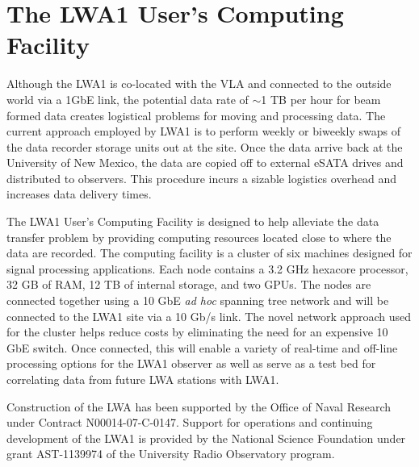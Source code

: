 \documentclass[11pt,twoside]{article}
\begin{document}
\section{\label{P42_sec:LUCF}The LWA1 User's Computing Facility}
Although the LWA1 is co-located with the VLA and connected to the outside world via a 1GbE link, the potential data rate of $\sim$1 TB per hour for beam formed data creates logistical problems for moving and processing data.  The current approach employed by LWA1 is to perform weekly or biweekly swaps of the data recorder storage units out at the site.  Once the data arrive back at the University of New Mexico, the data are copied off to external eSATA drives and distributed to observers.  This procedure incurs a sizable logistics overhead and increases data delivery times.

The LWA1 User's Computing Facility is designed to help alleviate the data transfer problem by providing computing resources located close to where the data are recorded.  The computing facility is a cluster of  six machines designed for signal processing applications.  Each node contains a 3.2 GHz hexacore processor, 32 GB of RAM, 12 TB of internal storage, and two GPUs.  The nodes are connected together using a 10 GbE {\it ad hoc} spanning tree network and will be connected to the LWA1 site via a 10 Gb/s link.  The novel network approach used for the cluster helps reduce costs by eliminating the need for an expensive 10 GbE switch.  Once connected, this will enable a variety of real-time and off-line processing options for the LWA1 observer as well as serve as a test bed for correlating data from future LWA stations with LWA1.

\acknowledgments Construction of the LWA has been supported by the Office of Naval Research under Contract N00014-07-C-0147.  Support for operations and continuing development of the LWA1 is provided by the National Science Foundation under grant AST-1139974 of the University Radio Observatory program.


\end{document}
